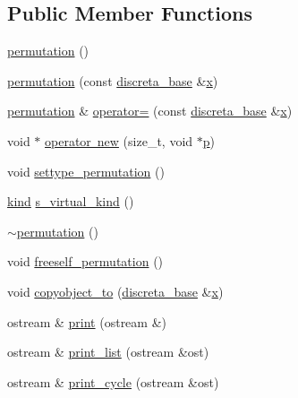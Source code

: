 \subsection*{Public Member Functions}
\begin{DoxyCompactItemize}
\item 
\mbox{\hyperlink{classpermutation_acb97f9398a52237f9f36f0ad5c8bf104}{permutation}} ()
\item 
\mbox{\hyperlink{classpermutation_a501f039c465ea7d47e6e0c0a165caa15}{permutation}} (const \mbox{\hyperlink{classdiscreta__base}{discreta\+\_\+base}} \&\mbox{\hyperlink{alphabet2_8_c_a6150e0515f7202e2fb518f7206ed97dc}{x}})
\item 
\mbox{\hyperlink{classpermutation}{permutation}} \& \mbox{\hyperlink{classpermutation_a7bc27f9f40363198e4f6b4c1d83ee3ba}{operator=}} (const \mbox{\hyperlink{classdiscreta__base}{discreta\+\_\+base}} \&\mbox{\hyperlink{alphabet2_8_c_a6150e0515f7202e2fb518f7206ed97dc}{x}})
\item 
void $\ast$ \mbox{\hyperlink{classpermutation_ac2a11ded23f8715f7b091d033d4a3eb0}{operator new}} (size\+\_\+t, void $\ast$\mbox{\hyperlink{alphabet2_8_c_a533391314665d6bf1b5575e9a9cd8552}{p}})
\item 
void \mbox{\hyperlink{classpermutation_af1eea29f86195cede9562e444664c28c}{settype\+\_\+permutation}} ()
\item 
\mbox{\hyperlink{discreta_8h_aaf25ee7e2306d78c74ec7bc48f092e81}{kind}} \mbox{\hyperlink{classpermutation_a2840be30bd1e636da5a955973c0c70b8}{s\+\_\+virtual\+\_\+kind}} ()
\item 
\mbox{\hyperlink{classpermutation_a006ecef14989dcf8539388d019e965e2}{$\sim$permutation}} ()
\item 
void \mbox{\hyperlink{classpermutation_a1f86343fa765d71c976d79e5ce372c12}{freeself\+\_\+permutation}} ()
\item 
void \mbox{\hyperlink{classpermutation_aed08e7ec26ec8ba0ed8c656a819ce43a}{copyobject\+\_\+to}} (\mbox{\hyperlink{classdiscreta__base}{discreta\+\_\+base}} \&\mbox{\hyperlink{alphabet2_8_c_a6150e0515f7202e2fb518f7206ed97dc}{x}})
\item 
ostream \& \mbox{\hyperlink{classpermutation_a3a4c219748ab79362fd440bea839c094}{print}} (ostream \&)
\item 
ostream \& \mbox{\hyperlink{classpermutation_a1732236cf59bbcaab008473f4917db3e}{print\+\_\+list}} (ostream \&ost)
\item 
ostream \& \mbox{\hyperlink{classpermutation_abf779232815eb4c16286cf642d214b50}{print\+\_\+cycle}} (ostream \&ost)

\end{DoxyCompactItemize}
